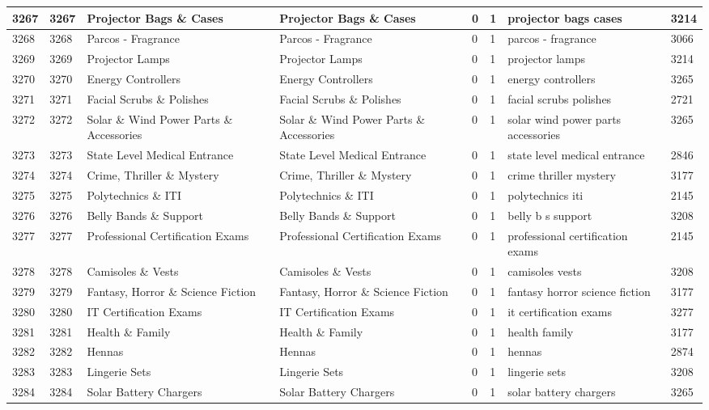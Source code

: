 \begin{longtable}{|l|l|l|l|l|l|l|l|}
3267 & 3267 & Projector Bags \& Cases & Projector Bags \& Cases & 0 & 1 & projector bags cases & 3214 \\ \hline 
3268 & 3268 & Parcos - Fragrance & Parcos - Fragrance & 0 & 1 & parcos - fragrance & 3066 \\ \hline 
3269 & 3269 & Projector Lamps & Projector Lamps & 0 & 1 & projector lamps & 3214 \\ \hline 
3270 & 3270 & Energy Controllers & Energy Controllers & 0 & 1 & energy controllers & 3265 \\ \hline 
3271 & 3271 & Facial Scrubs \& Polishes & Facial Scrubs \& Polishes & 0 & 1 & facial scrubs polishes & 2721 \\ \hline 
3272 & 3272 & Solar \& Wind Power Parts \& Accessories & Solar \& Wind Power Parts \& Accessories & 0 & 1 & solar wind power parts accessories & 3265 \\ \hline 
3273 & 3273 & State Level Medical Entrance & State Level Medical Entrance & 0 & 1 & state level medical entrance & 2846 \\ \hline 
3274 & 3274 & Crime, Thriller \& Mystery & Crime, Thriller \& Mystery & 0 & 1 & crime thriller mystery & 3177 \\ \hline 
3275 & 3275 & Polytechnics \& ITI & Polytechnics \& ITI & 0 & 1 & polytechnics iti & 2145 \\ \hline 
3276 & 3276 & Belly Bands \& Support & Belly Bands \& Support & 0 & 1 & belly b s support & 3208 \\ \hline 
3277 & 3277 & Professional Certification Exams & Professional Certification Exams & 0 & 1 & professional certification exams & 2145 \\ \hline 
3278 & 3278 & Camisoles \& Vests & Camisoles \& Vests & 0 & 1 & camisoles vests & 3208 \\ \hline 
3279 & 3279 & Fantasy, Horror \& Science Fiction & Fantasy, Horror \& Science Fiction & 0 & 1 & fantasy horror science fiction & 3177 \\ \hline 
3280 & 3280 & IT Certification Exams & IT Certification Exams & 0 & 1 & it certification exams & 3277 \\ \hline 
3281 & 3281 & Health \& Family & Health \& Family & 0 & 1 & health family & 3177 \\ \hline 
3282 & 3282 & Hennas & Hennas & 0 & 1 & hennas & 2874 \\ \hline 
3283 & 3283 & Lingerie Sets & Lingerie Sets & 0 & 1 & lingerie sets & 3208 \\ \hline 
3284 & 3284 & Solar Battery Chargers & Solar Battery Chargers & 0 & 1 & solar battery chargers & 3265 \\ \hline 

\end{longtable}
